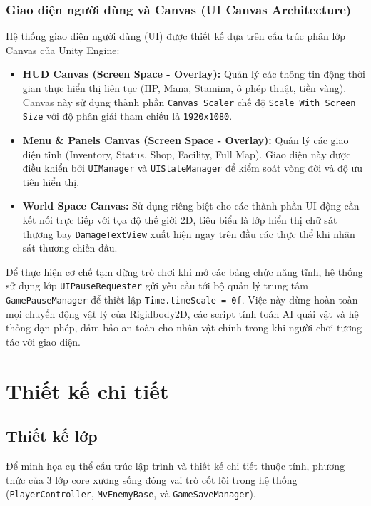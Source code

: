 \documentclass[../DoAn.tex]{subfiles}
\begin{document}
\subsubsection{Giao diện người dùng và Canvas (UI Canvas Architecture)}
Hệ thống giao diện người dùng (UI) được thiết kế dựa trên cấu trúc phân lớp Canvas của Unity Engine:
\begin{itemize}
    \item \textbf{HUD Canvas (Screen Space - Overlay):} Quản lý các thông tin động thời gian thực hiển thị liên tục (HP, Mana, Stamina, ô phép thuật, tiền vàng). Canvas này sử dụng thành phần \texttt{Canvas Scaler} chế độ \texttt{Scale With Screen Size} với độ phân giải tham chiếu là \texttt{1920x1080}.
    \item \textbf{Menu \& Panels Canvas (Screen Space - Overlay):} Quản lý các giao diện tĩnh (Inventory, Status, Shop, Facility, Full Map). Giao diện này được điều khiển bởi \texttt{UIManager} và \texttt{UIStateManager} để kiểm soát vòng đời và độ ưu tiên hiển thị.
    \item \textbf{World Space Canvas:} Sử dụng riêng biệt cho các thành phần UI động cần kết nối trực tiếp với tọa độ thế giới 2D, tiêu biểu là lớp hiển thị chữ sát thương bay \texttt{DamageTextView} xuất hiện ngay trên đầu các thực thể khi nhận sát thương chiến đấu.
\end{itemize}

Để thực hiện cơ chế tạm dừng trò chơi khi mở các bảng chức năng tĩnh, hệ thống sử dụng lớp \texttt{UIPauseRequester} gửi yêu cầu tới bộ quản lý trung tâm \texttt{GamePauseManager} để thiết lập \texttt{Time.timeScale = 0f}. Việc này dừng hoàn toàn mọi chuyển động vật lý của Rigidbody2D, các script tính toán AI quái vật và hệ thống đạn phép, đảm bảo an toàn cho nhân vật chính trong khi người chơi tương tác với giao diện.


\section{Thiết kế chi tiết}
\label{section:5.3}

\subsection{Thiết kế lớp}
\label{subsection:5.3.1}
Để minh họa cụ thể cấu trúc lập trình và thiết kế chi tiết thuộc tính, phương thức của 3 lớp core xương sống đóng vai trò cốt lõi trong hệ thống (\texttt{PlayerController}, \texttt{MvEnemyBase}, và \texttt{GameSaveManager}).
\end{document}
